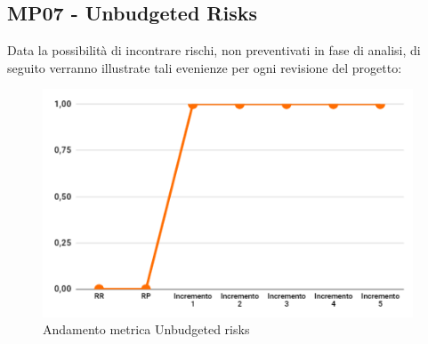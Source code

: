 \subsection{MP07 - Unbudgeted Risks}
Data la possibilità di incontrare rischi, non preventivati in fase di analisi, di seguito verranno illustrate tali evenienze per ogni revisione del progetto:
\begin{figure}[H]
	\centering
	\includegraphics[width=11cm]{images/unbudgeted_risks.png}
	\caption{Andamento metrica Unbudgeted risks}
\end{figure}





